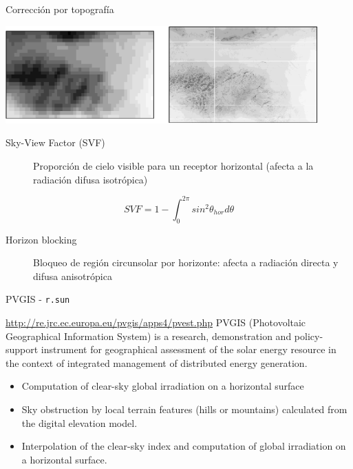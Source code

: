 \documentclass[xcolor={usenames,svgnames,dvipsnames}]{beamer}
\begin{document}
\begin{frame}[label={sec:orgf6030e3}]{Corrección por topografía}
\begin{center}
\begin{center}
\includegraphics[width=0.9\textwidth]{../figs/downscaling.pdf}
\end{center}
\end{center}

\begin{description}
\item[{Sky-View Factor (SVF)}] Proporción de cielo visible para un receptor horizontal (afecta a la radiación difusa isotrópica)
\end{description}
\[
SVF=1-\int_0^{2\pi}sin^{2} \theta_{hor} d\theta
\]

\begin{description}
\item[{Horizon blocking}] Bloqueo de región circunsolar por horizonte: afecta a radiación directa y difusa anisotrópica
\end{description}


\nocite{Bosch.Batlles.ea2010}
\nocite{Tovar-Pescador.Pozo-Vazquez.ea2006}
\nocite{Antonanzas-Torres.MartinezdePison.ea2013}
\nocite{Hofierka.Suri2002}
\end{frame}

\begin{frame}[fragile,label={sec:org1870532}]{PVGIS - \texttt{r.sun}}
 \begin{block}{\url{http://re.jrc.ec.europa.eu/pvgis/apps4/pvest.php}}
PVGIS (Photovoltaic Geographical Information System) is a research,
demonstration and policy-support instrument for geographical
assessment of the solar energy resource in the context of integrated
management of distributed energy generation.
\begin{itemize}
\item Computation of clear-sky global irradiation on a horizontal surface
\item Sky obstruction by local terrain features (hills or mountains)
calculated from the digital elevation model.
\item Interpolation of the clear-sky index and computation of global
irradiation on a horizontal surface.
\end{itemize}
\end{block}
\end{frame}
\end{document}
